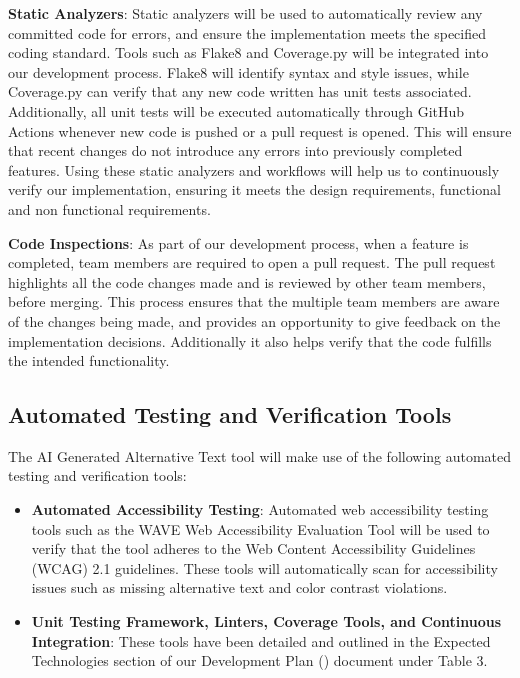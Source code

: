 \documentclass[12pt, titlepage]{article}
\begin{document}
\textbf{Static Analyzers}:
Static analyzers will be used to automatically review any committed code for errors, and ensure the implementation meets the specified coding standard.
Tools such as Flake8 and Coverage.py will be integrated into our development process. Flake8 will identify syntax and style issues, while Coverage.py can verify that any new code written has unit tests associated. 
Additionally, all unit tests will be executed automatically through GitHub Actions whenever new code is pushed or a pull request is opened. This will ensure that recent changes do not introduce any errors into previously completed features. 
Using these static analyzers and workflows will help us to continuously verify our implementation, ensuring it meets the design requirements, functional and non functional requirements.

\textbf{Code Inspections}:
As part of our development process, when a feature is completed, team members are required to open a pull request. The pull request highlights all the code changes made and is reviewed by other team members, before merging. 
This process ensures that the multiple team members are aware of the changes being made, and provides an opportunity to give feedback on 
the implementation decisions. Additionally it also helps verify that the code fulfills the intended functionality.

\subsection{Automated Testing and Verification Tools}
The AI Generated Alternative Text tool will make use of the following automated testing and verification tools: 
\begin{itemize}
  \item \textbf{Automated Accessibility Testing}: Automated web accessibility testing tools such as the WAVE Web Accessibility Evaluation Tool will be used to 
  verify that the tool adheres to the Web Content Accessibility Guidelines (WCAG) 2.1 guidelines. These tools will automatically scan for accessibility issues such as missing alternative text and color contrast violations.
  \item \textbf{Unit Testing Framework, Linters, Coverage Tools, and Continuous Integration}: These tools have been detailed and outlined in the Expected Technologies section
  of our Development Plan (\citet{DP}) document under Table 3. 
\end{itemize}
\end{document}
